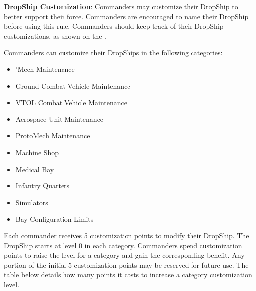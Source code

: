 \item {\bfseries DropShip Customization}: Commanders may customize their DropShip to better support their force.
Commanders are encouraged to name their DropShip before using this rule.
Commanders should keep track of their DropShip customizations, as shown on the .
\label{subsubsec:dropship_customization}

Commanders can customize their DropShips in the following categories:


\begin{itemize}

\item 'Mech Maintenance

\item Ground Combat Vehicle Maintenance

\item VTOL Combat Vehicle Maintenance

\item Aerospace Unit Maintenance

\item ProtoMech Maintenance

\item Machine Shop

\item Medical Bay

\item Infantry Quarters

\item Simulators

\item Bay Configuration Limits

\end{itemize}


Each commander receives 5 customization points to modify their DropShip.
The DropShip starts at level 0 in each category.
Commanders spend customization points to raise the level for a category and gain the corresponding benefit.
Any portion of the initial 5 customization points may be reserved for future use.
The table below details how many points it costs to increase a category customization level.

